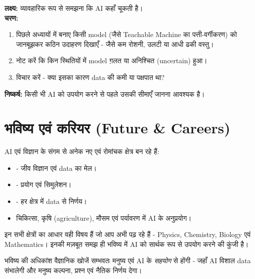\begin{gatividhi}[किसी AI उपकरण की सीमाएँ खोजिए]
\textbf{लक्ष्य:} व्यावहारिक रूप से समझना कि AI कहाँ चूकती है।\\[4pt]
\textbf{चरण:}
\begin{enumerate}[leftmargin=1.6em]
  \item पिछले अध्यायों में बनाए किसी model (जैसे Teachable Machine का पत्ती-वर्गीकरण)
        को जानबूझकर कठिन उदाहरण दिखाएँ - जैसे कम रोशनी, उलटी या आधी ढकी वस्तु।
  \item नोट करें कि किन स्थितियों में model ग़लत या अनिश्चित (uncertain) हुआ।
  \item विचार करें - क्या इसका कारण data की कमी या पक्षपात था?
\end{enumerate}
\textbf{निष्कर्ष:} किसी भी AI को उपयोग करने से पहले उसकी सीमाएँ जानना आवश्यक है।
\end{gatividhi}

\section{भविष्य एवं करियर (Future \& Careers)}

AI एवं विज्ञान के संगम से अनेक नए एवं रोमांचक क्षेत्र बन रहे हैं:
\begin{itemize}[leftmargin=1.4em]
  \item {} - जीव विज्ञान एवं data का मेल।
  \item {} - प्रयोग एवं सिमुलेशन।
  \item {} - हर क्षेत्र में data से निर्णय।
  \item चिकित्सा, कृषि (agriculture), मौसम एवं पर्यावरण में AI के अनुप्रयोग।
\end{itemize}

\noindent इन सभी क्षेत्रों का आधार वही विषय हैं जो आप अभी पढ़ रहे हैं - Physics,
Chemistry, Biology एवं Mathematics। इनकी मज़बूत समझ ही भविष्य में AI को सार्थक रूप से
उपयोग करने की कुंजी है।

\begin{jante}
भविष्य की अधिकांश वैज्ञानिक खोजें सम्भवतः मनुष्य एवं AI के \emph{सहयोग} से होंगी -
जहाँ AI विशाल data संभालेगी और मनुष्य कल्पना, प्रश्न एवं नैतिक निर्णय देगा।
\end{jante}


